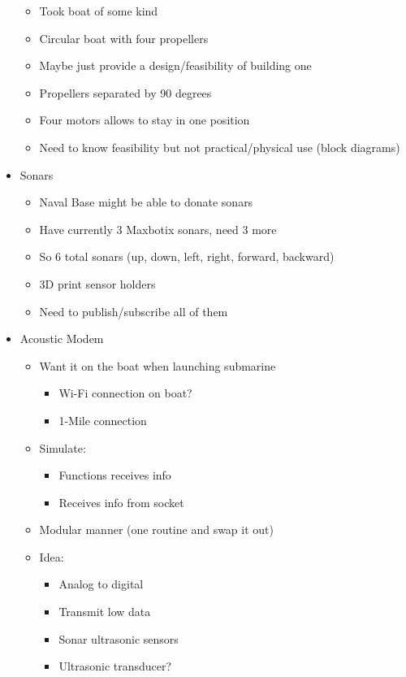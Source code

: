 \documentclass[12pt]{article}
\begin{document}
\begin{itemize}
\begin{itemize}
				\item Took boat of some kind
				\item Circular boat with four propellers
				\item Maybe just provide a design/feasibility of building one
				\item Propellers separated by 90 degrees
				\item Four motors allows to stay in one position
				\item Need to know feasibility but not practical/physical use (block diagrams)
			\end{itemize}
			\item Sonars
			\begin{itemize}
				\item Naval Base might be able to donate sonars
				\item Have currently 3 Maxbotix sonars, need 3 more
				\item So 6 total sonars (up, down, left, right, forward, backward)
				\item 3D print sensor holders
				\item Need to publish/subscribe all of them
			\end{itemize}
			\item Acoustic Modem
			\begin{itemize}
				\item Want it on the boat when launching submarine
				\begin{itemize}
					\item Wi-Fi connection on boat?
					\item 1-Mile connection
				\end{itemize}
				\item Simulate:
				\begin{itemize}
					\item Functions receives info
					\item Receives info from socket
				\end{itemize}
				\item Modular manner (one routine and swap it out)
				\item Idea:
				\begin{itemize}
					\item Analog to digital
					\item Transmit low data
					\item Sonar ultrasonic sensors
					\item Ultrasonic transducer?
				\end{itemize}

\end{itemize}
\end{itemize}
\end{document}
